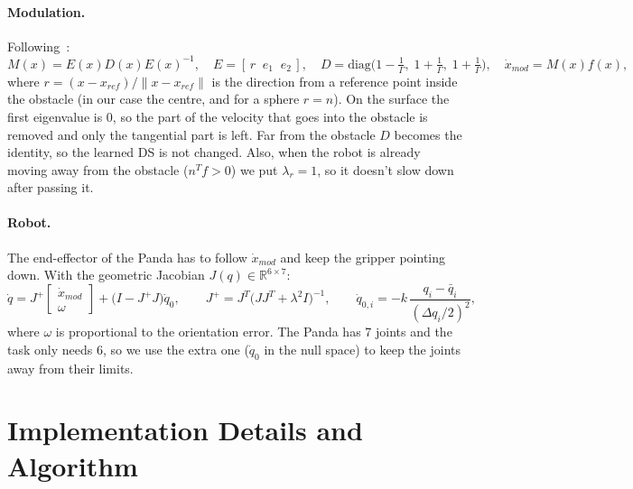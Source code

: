 ﻿\documentclass[10pt,a4paper]{article}
\begin{document}
\paragraph{Modulation.} Following~\cite{khansari2012,huber2019}:
\begin{equation}
M(x)=E(x)D(x)E(x)^{-1},\quad E=[\,r\;\;e_1\;\;e_2\,],\quad
D=\mathrm{diag}\Big(1-\tfrac{1}{\Gamma},\;1+\tfrac{1}{\Gamma},\;1+\tfrac{1}{\Gamma}\Big),\quad
\dot x_{mod}=M(x)f(x),
\end{equation}
where $r=(x-x_{ref})/\|x-x_{ref}\|$ is the direction from a reference point inside the obstacle (in our
case the centre, and for a sphere $r=n$). On the surface the first eigenvalue is 0, so the part of the
velocity that goes into the obstacle is removed and only the tangential part is left. Far from the
obstacle $D$ becomes the identity, so the learned DS is not changed. Also, when the robot is already
moving away from the obstacle ($n^{T}f>0$) we put $\lambda_r=1$, so it doesn't slow down after
passing it.

\paragraph{Robot.} The end-effector of the Panda has to follow $\dot x_{mod}$ and keep the gripper
pointing down. With the geometric Jacobian $J(q)\in\mathbb{R}^{6\times 7}$:
\begin{equation}
\dot q = J^{+}\begin{bmatrix}\dot x_{mod}\\ \omega\end{bmatrix}
+\big(I-J^{+}J\big)\dot q_0,\qquad
J^{+}=J^{T}\big(JJ^{T}+\lambda^2 I\big)^{-1},\qquad
\dot q_{0,i}=-k\,\frac{q_i-\bar q_i}{(\Delta q_i/2)^2},
\end{equation}
where $\omega$ is proportional to the orientation error. The Panda has 7 joints and the task only
needs 6, so we use the extra one ($\dot q_0$ in the null space) to keep the joints away from their
limits.

\section{Implementation Details and Algorithm}
\end{document}
